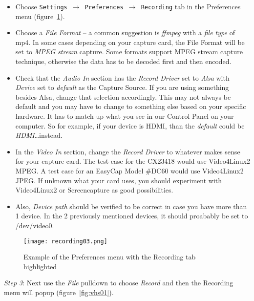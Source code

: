\begin{itemize}
    \item Choose \texttt{Settings $\rightarrow$ Preferences $\rightarrow$ Recording} tab in the Preferences menu (figure~\ref{fig:recordingx}).
    \item Choose a \textit{File Format} -- a common suggestion is \textit{ffmpeg} with a \textit{file type} of mp4.  In some cases depending on your capture card, the File Format will be set to \textit{MPEG stream} capture. Some formats support MPEG stream capture technique, otherwise the data has to be decoded first and then encoded.
    \item Check that the \textit{Audio In} section has the \textit{Record Driver} set to \textit{Alsa} with \textit{Device} set to \textit{default} as the Capture Source.  If you are using something besides Alsa, change that selection accordingly. This may not always be default and you may have to change to something else based on your specific hardware. It has to match up what you see in our Control Panel on your computer. So for example, if your device is HDMI, than the \textit{default} could be \textit{HDMI}\dots instead.
    \item In the \textit{Video In} section, change the\textit{ Record Driver} to whatever makes sense for your capture card. The test case for the CX23418 would use Video4Linux2 MPEG. A test case for an EasyCap Model \#DC60 would use Video4Linux2 JPEG.  If unknown what your card uses, you should experiment with Video4Linux2 or Screencapture as good possibilities.
    \item Also, \textit{Device path} should be verified to be correct in case you have more than 1 device. In the 2 previously mentioned devices, it should proabably be set to /dev/video0.
\end{itemize}

\begin{figure}[htpb]
    \centering
    \texttt{[image: recording03.png]}
    \caption{Example of the Preferences menu with the Recording tab highlighted}
    \label{fig:recordingx}
\end{figure}

\textit{Step 3}: Next use the \textit{File} pulldown to choose \textit{Record} and then the Recording menu will popup (figure~\ref{fig:vhs01}).

